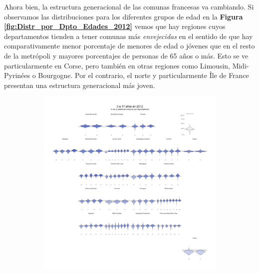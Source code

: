 Ahora bien, la estructura generacional de las comunas francesas va cambiando. Si observamos las distribuciones para los diferentes grupos de edad en la \textbf{Figura \ref{fig:Distr_por_Dpto_Edades_2012}} vemos que hay regiones cuyos departamentos tienden a tener comunas más \textit{envejecidas} en el sentido de que hay comparativamente menor porcentaje de menores de edad o jóvenes que en el resto de la metrópoli y mayores porcentajes de personas de 65 años o más. Esto se ve particularmente en Corse, pero también en otras regiones como Limousin, Midi-Pyrinées o Bourgogne. Por el contrario, el norte y particularmente Île de France presentan una estructura generacional más joven.\\

\begin{figure}[h]
	\centering
	\begin{subfigure}{0.3\textwidth}
	\includegraphics[width = \textwidth]{Figs/AED/Geofacet_Distr_por_Dpto_Ed1_2012}
	\end{subfigure}
	~
	\begin{subfigure}{0.3\textwidth}

\end{subfigure}
\end{figure}
